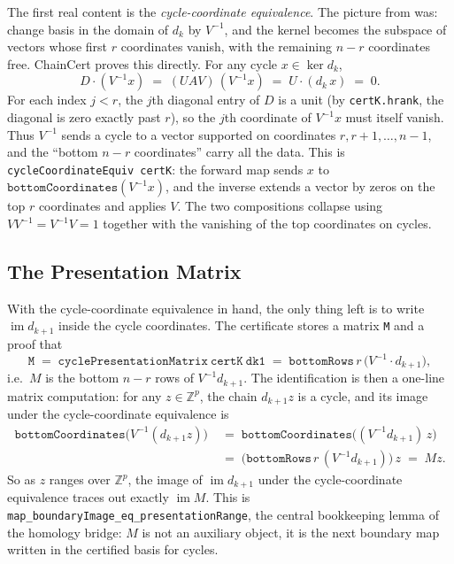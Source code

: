 \documentclass[11pt]{article}
\theoremstyle{plain}
\theoremstyle{definition}
\theoremstyle{remark}
\newcommand{\lean}[1]{\lstinline[language=lean]|#1|}
\begin{document}
The first real content is the \emph{cycle-coordinate equivalence}. The picture
from  was: change basis in the domain of \(d_k\) by
\(V^{-1}\), and the kernel becomes the subspace of vectors whose first \(r\)
coordinates vanish, with the remaining \(n - r\) coordinates free. ChainCert
proves this directly. For any cycle \(x \in \ker d_k\),
\[
    D \cdot (V^{-1} x)
      \;=\; (UAV)\,(V^{-1} x)
      \;=\; U \cdot (d_k \, x)
      \;=\; 0.
\]
For each index \(j < r\), the \(j\)th diagonal entry of \(D\) is a unit (by
\lean{certK.hrank}, the diagonal is zero exactly past \(r\)), so the \(j\)th
coordinate of \(V^{-1} x\) must itself vanish. Thus \(V^{-1}\) sends a cycle to
a vector supported on coordinates \(r, r+1, \ldots, n - 1\), and the
``bottom \(n - r\) coordinates'' carry all the data. This is
\lean{cycleCoordinateEquiv certK}: the forward map sends \(x\) to
\(\mathtt{bottomCoordinates}(V^{-1} x)\), and the inverse extends a vector by
zeros on the top \(r\) coordinates and applies \(V\). The two compositions
collapse using \(V V^{-1} = V^{-1} V = 1\) together with the vanishing of
the top coordinates on cycles.

\subsection{The Presentation Matrix}

With the cycle-coordinate equivalence in hand, the only thing left is to write
\(\operatorname{im} d_{k+1}\) inside the cycle coordinates. The certificate
stores a matrix \lean{M} and a proof that
\[
    \mathtt{M} \;=\; \mathtt{cyclePresentationMatrix\ certK\ dk1}
        \;=\; \mathtt{bottomRows}\, r\, \bigl(V^{-1} \cdot d_{k+1}\bigr),
\]
i.e.\ \(M\) is the bottom \(n - r\) rows of \(V^{-1} d_{k+1}\). The
identification is then a one-line matrix computation: for any
\(z \in \mathbb{Z}^p\), the chain \(d_{k+1} z\) is a cycle, and its image
under the cycle-coordinate equivalence is
\begin{align*}
    \mathtt{bottomCoordinates}\bigl(V^{-1} (d_{k+1} z)\bigr)
      &\;=\; \mathtt{bottomCoordinates}\bigl((V^{-1} d_{k+1})\, z\bigr) \\
      &\;=\; \bigl(\mathtt{bottomRows}\, r\,(V^{-1} d_{k+1})\bigr)\, z
       \;=\; M z.
\end{align*}
So as \(z\) ranges over \(\mathbb{Z}^p\), the image of
\(\operatorname{im} d_{k+1}\) under the cycle-coordinate equivalence traces
out exactly \(\operatorname{im} M\). This is
\lean{map_boundaryImage_eq_presentationRange}, the central bookkeeping lemma
of the homology bridge: \(M\) is not an auxiliary object, it is the next
boundary map written in the certified basis for cycles.
\end{document}
